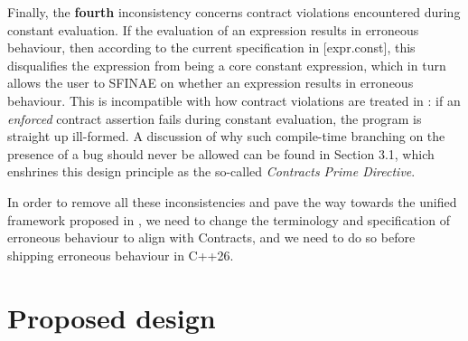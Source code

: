 Finally, the \textbf{fourth} inconsistency concerns contract violations encountered during constant evaluation. If the evaluation of an expression results in erroneous behaviour, then according to the current specification in [expr.const], this disqualifies the expression from being a core constant expression, which in turn allows the user to SFINAE on whether an expression results in erroneous behaviour. This is incompatible with how contract violations are treated in \cite{P2900R13}: if an \emph{enforced} contract assertion fails during constant evaluation, the program is straight up ill-formed. A discussion of why such compile-time branching on the presence of a bug should never be allowed can be found in \cite{P2900R13} Section 3.1, which enshrines this design principle as the so-called \emph{Contracts Prime Directive}.

In order to remove all these inconsistencies and pave the way towards the unified framework proposed in \cite{P3100R1}, we need to change the terminology and specification of erroneous behaviour to align with Contracts, and we need to do so before shipping erroneous behaviour in C++26.


\section{Proposed design}

